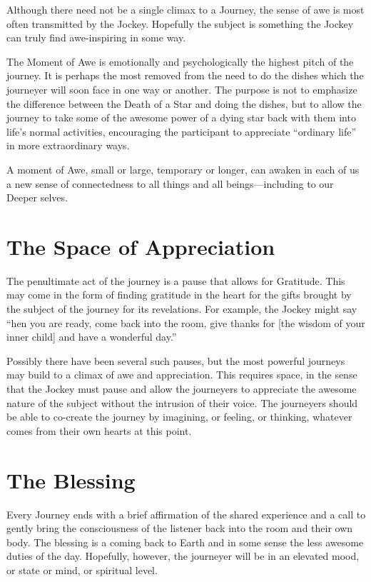 \documentclass[12pt]{book}
\begin{document}
Although there need not be a single climax to a Journey, the sense of
awe is most often transmitted by the Jockey. Hopefully the subject is
something the Jockey can truly find awe-inspiring in some way.
					
The Moment of Awe is emotionally and psychologically the highest pitch
of the journey. It is perhaps the most removed from the need to do the
dishes which the journeyer will soon face in one way or another. The
purpose is not to emphasize the difference between the Death of a Star
and doing the dishes, but to allow the journey to take some of the
awesome power of a dying star back with them into life’s normal
activities, encouraging the participant to appreciate “ordinary life”
in more extraordinary ways.

A moment of Awe, small or large, temporary or longer, can awaken in each
of us a new sense of connectedness to all things and all
beings---including to our Deeper selves.
					
\section{The Space of Appreciation}
					
The penultimate act of the journey is a pause that allows for
Gratitude.  This may come in the form of finding gratitude in the
heart for the gifts brought by the subject of the journey for its
revelations. For example, the Jockey might say ``hen you are ready,
come back into the room, give thanks for [the wisdom of your inner
  child] and have a wonderful day.''

Possibly there have been several such pauses, but the most powerful
journeys may build to a climax of awe and appreciation. This requires
space, in the sense that the Jockey must pause and allow the
journeyers to appreciate the awesome nature of the subject without the
intrusion of their voice. The journeyers should be able to co-create
the journey by imagining, or feeling, or thinking, whatever comes from
their own hearts at this point.

\section{The Blessing}
					
Every Journey ends with a brief affirmation of the shared experience
and a call to gently bring the consciousness of the listener back into
the room and their own body. The blessing is a coming back to Earth
and in some sense the less awesome duties of the day. Hopefully,
however, the journeyer will be in an elevated mood, or state or mind,
or spiritual level.
					
\end{document}
